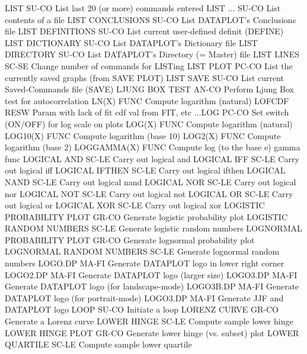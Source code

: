 LIST                        SU-CO List last 20 (or more) commands entered
LIST ...                    SU-CO List contents of a file
LIST CONCLUSIONS            SU-CO List DATAPLOT's Conclusions file
LIST DEFINITIONS            SU-CO List current user-defined definit (DEFINE)
LIST DICTIONARY             SU-CO List DATAPLOT's Dictionary file
LIST DIRECTORY              SU-CO List DATAPLOT's Directory (= Master) file
LIST LINES                  SC-SE Change number of commands for LISTing
LIST PLOT                   PC-CO List the currently saved graphs (from SAVE PLOT)
LIST SAVE                   SU-CO List current Saved-Commands file (SAVE)
LJUNG BOX TEST              AN-CO Perform Ljung Box test for autocorrelation
LN(X)                       FUNC  Compute logarithm (natural)
LOFCDF                      RESW  Param with lack of fit cdf val from FIT, etc
...LOG                      PC-CO Set switch (ON/OFF) for log scale on plots
LOG(X)                      FUNC  Compute logarithm (natural)
LOG10(X)                    FUNC  Compute logarithm (base 10)
LOG2(X)                     FUNC  Compute logarithm (base 2)
LOGGAMMA(X)                 FUNC  Compute log (to the base e) gamma func
LOGICAL AND                 SC-LE Carry out logical and
LOGICAL IFF                 SC-LE Carry out logical iff
LOGICAL IFTHEN              SC-LE Carry out logical ifthen
LOGICAL NAND                SC-LE Carry out logical nand
LOGICAL NOR                 SC-LE Carry out logical nor
LOGICAL NOT                 SC-LE Carry out logical not
LOGICAL OR                  SC-LE Carry out logical or
LOGICAL XOR                 SC-LE Carry out logical xor
LOGISTIC PROBABILITY PLOT   GR-CO Generate logistic probability plot
LOGISTIC RANDOM NUMBERS     SC-LE Generate logistic random numbers
LOGNORMAL PROBABILITY PLOT  GR-CO Generate lognormal probability plot
LOGNORMAL RANDOM NUMBERS    SC-LE Generate lognormal random numbers
LOGO.DP                     MA-FI Generate DATAPLOT logo in lower right corner
LOGO2.DP                    MA-FI Generate DATAPLOT logo (larger size)
LOGO3.DP                    MA-FI Generate DATAPLOT logo (for landscape-mode)
LOGO3B.DP                   MA-FI Generate DATAPLOT logo (for portrait-mode)
LOGO3.DP                    MA-FI Generate JJF and DATAPLOT logo
LOOP                        SU-CO Initiate a loop
LORENZ CURVE                GR-CO Generate a Lorenz curve
LOWER HINGE                 SC-LE Compute sample lower hinge
LOWER HINGE PLOT            GR-CO Generate lower hinge (vs. subset) plot
LOWER QUARTILE              SC-LE Compute sample lower quartile
